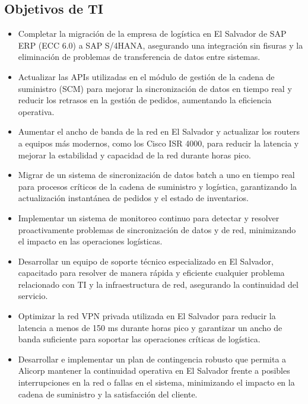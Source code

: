 \subsection{Objetivos de TI}
    \begin{itemize}
        \item Completar la migración de la empresa de logística en El Salvador de SAP ERP (ECC 6.0) a SAP S/4HANA, asegurando una integración sin fisuras y la eliminación de problemas de transferencia de datos entre sistemas. 
        \item Actualizar las APIs utilizadas en el módulo de gestión de la cadena de suministro (SCM) para mejorar la sincronización de datos en tiempo real y reducir los retrasos en la gestión de pedidos, aumentando la eficiencia operativa. 
        \item Aumentar el ancho de banda de la red en El Salvador y actualizar los routers a equipos más modernos, como los Cisco ISR 4000, para reducir la latencia y mejorar la estabilidad y capacidad de la red durante horas pico. 
        \item Migrar de un sistema de sincronización de datos batch a uno en tiempo real para procesos críticos de la cadena de suministro y logística, garantizando la actualización instantánea de pedidos y el estado de inventarios. 
        \item Implementar un sistema de monitoreo continuo para detectar y resolver proactivamente problemas de sincronización de datos y de red, minimizando el impacto en las operaciones logísticas. 
        \item Desarrollar un equipo de soporte técnico especializado en El Salvador, capacitado para resolver de manera rápida y eficiente cualquier problema relacionado con TI y la infraestructura de red, asegurando la continuidad del servicio. 
        \item Optimizar la red VPN privada utilizada en El Salvador para reducir la latencia a menos de 150 ms durante horas pico y garantizar un ancho de banda suficiente para soportar las operaciones críticas de logística. 
        \item Desarrollar e implementar un plan de contingencia robusto que permita a Alicorp mantener la continuidad operativa en El Salvador frente a posibles interrupciones en la red o fallas en el sistema, minimizando el impacto en la cadena de suministro y la satisfacción del cliente.
    \end{itemize}

